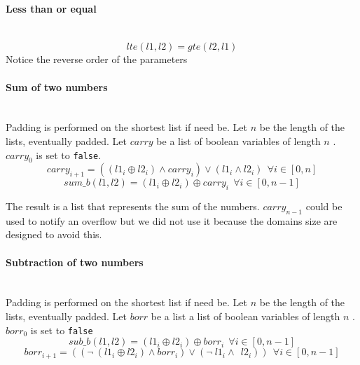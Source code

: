   \paragraph*{Less than or equal} \hfill \\
    \begin{equation}
      lte(l1, l2) = gte(l2, l1) %
    \end{equation}
    Notice the reverse order of the parameters\\

  \paragraph*{Sum of two numbers} \hfill \\
    Padding is performed on the shortest list if need be.
    Let \(n\)  be the length of the lists, eventually padded. Let \(carry\)  be a list of boolean
    variables of length \(n\) . \(carry_0\)  is set to \texttt{false}.  
    \begin{equation}
      carry_{i+1} = ((l1_i \oplus l2_i) \land carry_i) \lor (l1_i \land l2_i) \ \ \forall i \in [0, n]
    \end{equation}
    \begin{equation}
      sum\_b(l1, l2) = (l1_i \oplus l2_i) \oplus carry_i \  \ \forall i \in [0, n-1]
  \end{equation}

  The result is a list that represents the sum of the numbers. \(carry_{n-1}\)  could be used to
  notify an overflow but we did  not use it because the domains size are designed to avoid this.\\

\paragraph*{Subtraction of two numbers} \hfill \\
  Padding is performed on the shortest list if need be.
  Let \(n\)  be the length of the lists, eventually padded.
  Let \(borr\)  be a list a list of boolean variables of length \(n\) . \(borr_0\)  is set to \texttt{false} 
  \begin{equation}
    sub\_b(l1, l2) = (l1_i \oplus l2_i) \oplus borr_i \ \ \forall i \in [0, n-1]
  \end{equation}
  \begin{equation}
    borr_{i+1} = ((\neg \ (l1_i \oplus l2_i) \land borr_i) \lor (\neg \ l1_i \land \ \ l2_i)) \ \ 
      \forall i \in [0, n-1]
  \end{equation}

